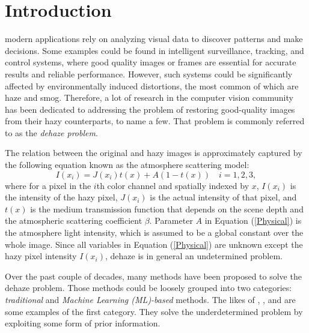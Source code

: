 \documentclass[journal]{IEEEtran}
\begin{document}
%
\IEEEpeerreviewmaketitle



\section{Introduction}

 modern applications rely on analyzing visual data to discover patterns and make decisions. Some examples could be found in intelligent surveillance, tracking, and control systems, where good quality images or frames are essential for accurate results and reliable performance. However, such systems could be significantly affected by environmentally induced distortions, the most common of which are haze and smog. Therefore, a lot of research in the computer vision community has been dedicated to addressing the problem of restoring good-quality images from their hazy counterparts, \cite{ColorAtten,DehazeNet,DarkChanPrior,berman2016non} to name a few. That problem is commonly referred to as the \textit{dehaze problem}.

The relation between the original and hazy images  \cite{narasimhan2002vision} is approximately captured by the following equation known as the atmosphere scattering model:
\begin{equation}\label{Physical}
I(x_{i})=J(x_{i})t(x)+A(1-t(x))\quad i=1,2,3 ,
\end{equation}
where for a pixel in the $i$th color channel and spatially indexed by $x$, $I(x_{i})$ is the intensity of the hazy pixel, $J(x_{i})$ is the actual intensity of that pixel, and $t(x)$ is the medium transmission function that depends on the scene depth and the atmospheric scattering coefficient $\beta$. Parameter $A$ in Equation (\ref{Physical}) is the atmosphere light intensity, which is assumed to be a global constant over the whole image. Since all variables in Equation (\ref{Physical}) are unknown except the hazy pixel intensity $I(x_{i})$, dehaze is in general an undetermined problem.

Over the past couple of decades, many methods have been proposed to solve the dehaze problem. Those methods could be loosely grouped into two categories: \textit{traditional} and \textit{Machine Learning (ML)-based} methods. The likes of \cite{DarkChanPrior}, \cite{ColorAtten}, and \cite{MarkovRandField} are some examples of the first category. They solve the underdetermined problem by exploiting some form of  prior information. 
\end{document}

